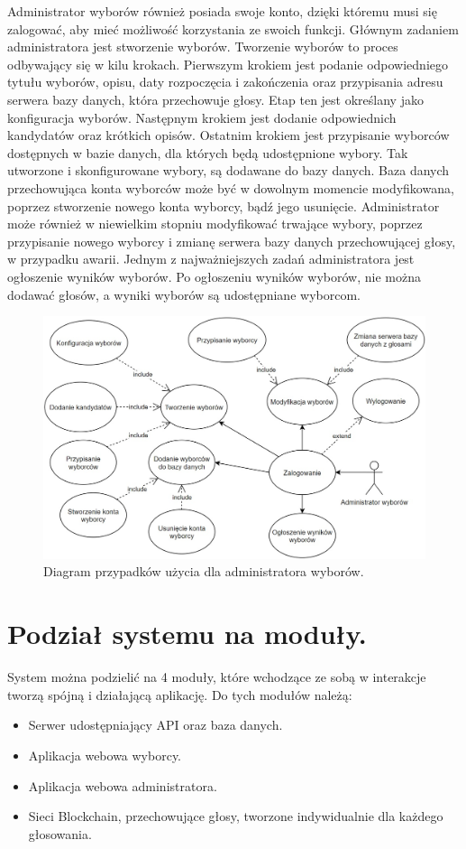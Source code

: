\documentclass[a4paper,13pt]{report}
\begin{document}
Administrator wyborów również posiada swoje konto, dzięki któremu musi się zalogować, aby mieć możliwość korzystania ze swoich funkcji. Głównym zadaniem administratora jest stworzenie wyborów. Tworzenie wyborów to proces odbywający się w kilu krokach. Pierwszym krokiem jest podanie odpowiedniego tytułu wyborów, opisu, daty rozpoczęcia i zakończenia oraz przypisania adresu serwera bazy danych, która przechowuje głosy. Etap ten jest określany jako konfiguracja wyborów. Następnym krokiem jest dodanie odpowiednich kandydatów oraz krótkich opisów. Ostatnim krokiem jest przypisanie wyborców dostępnych w bazie danych, dla których będą udostępnione wybory. Tak utworzone i skonfigurowane wybory, są dodawane do bazy danych.
Baza danych przechowująca konta wyborców może być w dowolnym momencie modyfikowana, poprzez stworzenie nowego konta wyborcy, bądź jego usunięcie. Administrator może również w niewielkim stopniu modyfikować trwające wybory, poprzez przypisanie nowego wyborcy i zmianę serwera bazy danych przechowującej głosy, w przypadku awarii. Jednym z najważniejszych zadań administratora jest ogłoszenie wyników wyborów. Po ogłoszeniu wyników wyborów, nie można dodawać głosów, a wyniki wyborów są udostępniane wyborcom.

\begin{figure}[h]
    \centering
    \includegraphics[scale=0.4]{images/admin_use_case.jpg}
    \caption{Diagram przypadków użycia dla administratora wyborów.}
\end{figure}

\section{Podział systemu na moduły.}
System można podzielić na 4 moduły, które wchodzące ze sobą w interakcje tworzą spójną i działającą aplikację. Do tych modułów należą:
\begin{itemize}
    \item Serwer udostępniający API oraz baza danych.
    \item Aplikacja webowa wyborcy.
    \item Aplikacja webowa administratora.
    \item Sieci Blockchain, przechowujące głosy, tworzone indywidualnie dla każdego głosowania.
\end{itemize}
\end{document}
